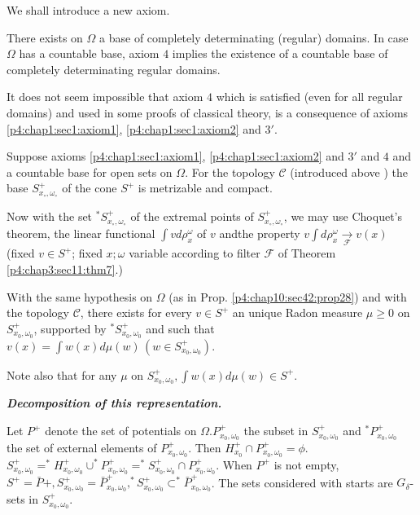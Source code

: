 We shall introduce a new axiom.
 
\begin{Axiom}\label{p4:chap10:sec42:axiom4} %
  There exists on $\Omega$ a base of completely determinating
  (regular) domains. In case $\Omega$ has a countable base, axiom $4$
  implies the existence of a countable base of completely
  determinating regular domains. 
\end{Axiom} 
 
It does not seem impossible that axiom $4$ which is satisfied (even
for all regular domains) and used in some proofs of classical theory,
is a consequence of axioms \ref{p4:chap1:sec1:axiom1},
\ref{p4:chap1:sec1:axiom2} and $3'$. 

\begin{prop}\label{p4:chap10:sec42:prop28} %
  Suppose axioms \ref{p4:chap1:sec1:axiom1},
  \ref{p4:chap1:sec1:axiom2} and $3'$ and
  $4$ and a countable base for open sets 
  on $\Omega$. For the topology $\mathscr{C}$ (introduced above ) the
  base $S^+_{x_\circ, \omega_\circ}$ of the cone $S^+$ is metrizable and
  compact. 
\end{prop}

Now with the set ${}^*S^+_{x_\circ, \omega_\circ}$ of the extremal points of
$S^+_{x_\circ, \omega_\circ}$, we may use Choquet's theorem, the linear
functional $\int v d \rho^\omega_x $ of $v$ and\pageoriginale the property $v \int d
\rho^\omega _x \xrightarrow[{\mathcal{F}}] {}v(x)$ (fixed $v \in S^+$;
fixed $x; \omega$ variable according to filter $\mathscr{F}$ of
Theorem \ref{p4:chap3:sec11:thm7}.) 

\begin{thm}\label{p4:chap10:sec42:thm36} %
  With the same hypothesis on $\Omega$ (as in
  Prop. \ref{p4:chap10:sec42:prop28}) and with the
  topology $\mathscr{C}$, there exists for every $v \in S^+$ an unique
  Radon measure $\mu \geq 0$ on $S^+_{x_0,\omega_0}$, supported by
  ${}^*S^+_{x_0, \omega_0}$ and such that $v(x)=\int w(x)d \mu (w)\, (w \in
  S^+_{x_0,\omega_0})$. 
\end{thm}

Note also that for any $\mu$ on $S^+_{x_0,\omega_0}, \int w(x)d\mu
(w)\in S^+$. 

\noindent \textbf{\textit{ Decomposition of this representation.}}

Let $P^+$ denote the set of potentials on $\Omega. P^+_{x_0,\omega_0}$
the subset in $S^+_{x_0,\omega_0}$ and $^*P^+_{x_0,\omega_0}$ the set
of external elements of $P^+_{x_0,\omega_0}$. Then $H^+_{x_0} \cap
P^+_{x_0,\omega_0}=\phi$. $S^+_{x_0,\omega_0}=^*H^+_{x_0,\omega_0}\cup
^*P^+_{x_0,\omega_0}=^*S^+_{x_0,\omega_0}\cap
P^+_{x_0,\omega_0}$. When $P^+$ is not empty,
$S^+=\bar{P}+,S^+_{x_0,\omega_0}=\bar{P}^+_{x_0,\omega_0},^*S^+_{x_0,\omega_0}
\subset ^*\bar{P}^+_{x_0,\omega_0}$. The sets considered with starts
are $G_\delta$-sets in $S^+_{x_0,\omega_0}$. 

